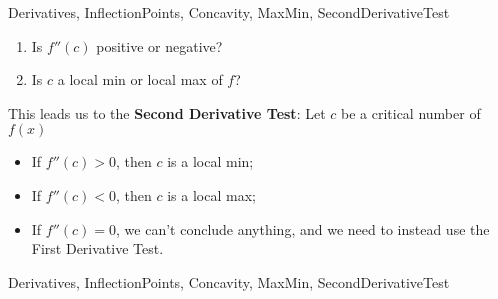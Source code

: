 \begin{tagblock}{Derivatives, InflectionPoints, Concavity, MaxMin, SecondDerivativeTest }
\begin{question}
\begin{enumerate}
\begin{minipage}{.6\textwidth}
\begin{enumerate}
\item Is $f ''(c)$ positive or negative?  

\vspace{.5in}
\item Is $c$ a local min or local max of $f$?

\vspace{.5in}

\end{enumerate}

\end{minipage}


\end{enumerate}



This leads us to the \textbf{Second Derivative Test}:  Let $c$ be a critical number of $f(x)$
\begin{itemize}
\item If $f''(c) >0$, then $c$ is a local min;
\item If $f''(c) <0$, then $c$ is a local max; 
\item If $f''(c) =0$, we can't conclude anything, and we need to instead use the First Derivative Test.
\end{itemize}




	
\begin{tags}
	   Derivatives, InflectionPoints, Concavity, MaxMin, SecondDerivativeTest
\end{tags}
	
\begin{diary}
\end{diary}
	
\begin{solution}
	   
\end{solution}
	
\end{question}

\end{tagblock}



